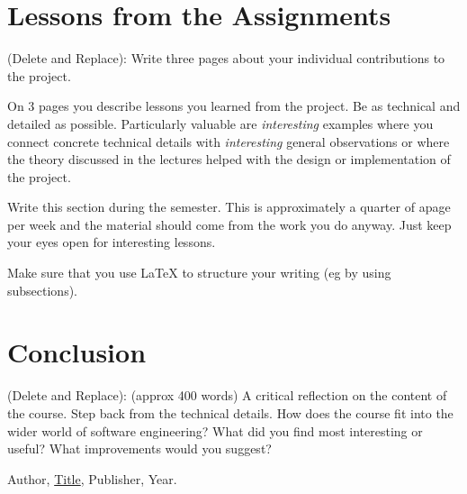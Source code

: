 \documentclass{article}
\theoremstyle{theorem}
\theoremstyle{definition}
\theoremstyle{remark}
\begin{document}
\section{Lessons from the Assignments}

(Delete and Replace): Write three pages about your individual contributions to the project.

On 3 pages you describe lessons you learned from the project. Be as technical and detailed as possible. Particularly valuable are \emph{interesting} examples where you connect concrete technical details with \emph{interesting} general observations or where the theory discussed in the lectures helped with the design or implementation of the project.

Write this section during the semester. This is approximately a quarter of apage per week and the material should come from the work you do anyway. Just keep your eyes open for interesting lessons.

Make sure that you use \LaTeX{} to structure your writing (eg by using subsections).

\section{Conclusion}\label{conclusion}

(Delete and Replace): (approx 400 words) A critical reflection on the content of the course. Step back from the technical details. How does the course fit into the wider world of software engineering? What did you find most interesting or useful? What improvements would you suggest?

\begin{thebibliography}{99}
 Author, \href{https://en.wikipedia.org/wiki/LaTeX}{Title}, Publisher, Year.
\end{thebibliography}
\end{document}
